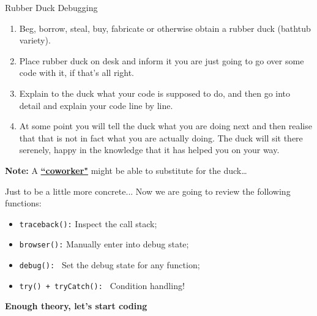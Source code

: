 \documentclass[
hyperref={bookmarks=false},
xcolor={dvipsnames,svgnames*,x11names*}, 
12pt
]{beamer}
\begin{document}
\begin{frame}{Rubber Duck Debugging}
\vspace{-0.5cm}
{\small
\begin{enumerate}
\item Beg, borrow, steal, buy, fabricate or otherwise obtain a rubber duck (bathtub variety).
\item Place rubber duck on desk and inform it you are just going to go over some code with it, if that’s all right.
\item Explain to the duck what your code is supposed to do, and then go into detail and explain your code line by line.
\item At some point you will tell the duck what you are doing next and then realise that that is not in fact what you are actually doing. The duck will sit there serenely, happy in the knowledge that it has helped you on your way.
\end{enumerate}
}

\textbf{Note:} A \href{https://sites.google.com/unimib.it/camerlenghi-federico/}{\textbf{``coworker"}} might be able to substitute for the duck\dots
\end{frame}

\begin{frame}{Just to be a little more concrete...}
\vspace{-0.5cm}
Now we are going to review the following functions: 
\begin{itemize}
\itemsep 3ex
\item \texttt{traceback():} Inspect the call stack;
\item \texttt{browser():} Manually enter into debug state;
\item \texttt{debug(): } Set the debug state for any function;
\item \texttt{try() + tryCatch(): } Condition handling! 
\end{itemize}
\end{frame}

\begin{frame}
	\vspace{2cm}
	\begin{center}
		\Huge
		\textbf{Enough theory, let's start coding }
	\end{center}
\end{frame}
\end{document}
